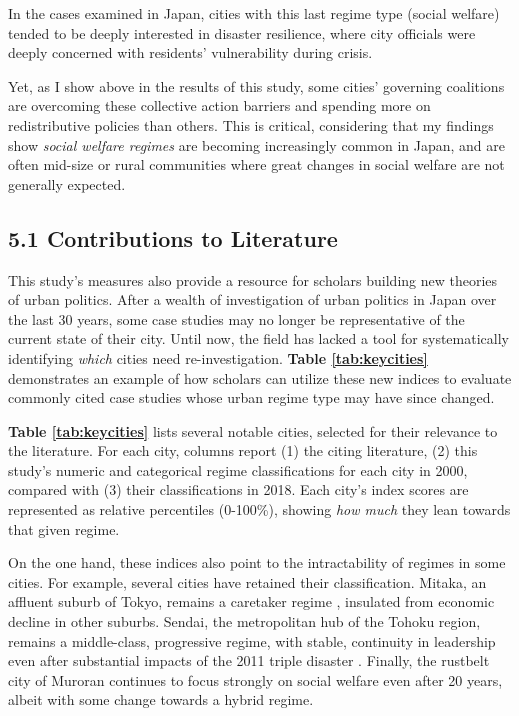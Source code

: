 \documentclass[preprint, 3p,
authoryear]{elsarticle} %
\begin{document}
In the cases examined in Japan, cities with this last regime type
(social welfare) tended to be deeply interested in disaster resilience,
where city officials were deeply concerned with residents' vulnerability
during crisis.

Yet, as I show above in the results of this study, some cities'
governing coalitions are overcoming these collective action barriers and
spending more on redistributive policies than others. This is critical,
considering that my findings show \emph{social welfare regimes} are
becoming increasingly common in Japan, and are often mid-size or rural
communities where great changes in social welfare are not generally
expected.

\hypertarget{contributions-to-literature}{%
\subsection{5.1 Contributions to
Literature}\label{contributions-to-literature}}

This study's measures also provide a resource for scholars building new
theories of urban politics. After a wealth of investigation of urban
politics in Japan over the last 30 years, some case studies may no
longer be representative of the current state of their city. Until now,
the field has lacked a tool for systematically identifying \emph{which}
cities need re-investigation. \textbf{Table \ref{tab:keycities}}
demonstrates an example of how scholars can utilize these new indices to
evaluate commonly cited case studies whose urban regime type may have
since changed.

\textbf{Table \ref{tab:keycities}} lists several notable cities,
selected for their relevance to the literature. For each city, columns
report (1) the citing literature, (2) this study's numeric and
categorical regime classifications for each city in 2000, compared with
(3) their classifications in 2018. Each city's index scores are
represented as relative percentiles (0-100\%), showing \emph{how much}
they lean towards that given regime.

On the one hand, these indices also point to the intractability of
regimes in some cities. For example, several cities have retained their
classification. Mitaka, an affluent suburb of Tokyo, remains a caretaker
regime
\citep{steiner_1957, fukuchi_and_yamaguchi_1997, ohashi_and_phelps_2021},
insulated from economic decline in other suburbs. Sendai, the
metropolitan hub of the Tohoku region, remains a middle-class,
progressive regime, with stable, continuity in leadership even after
substantial impacts of the 2011 triple disaster
\citep{morris_2012, tsuji_2017}. Finally, the rustbelt city of Muroran
\citep{edgington_2013} continues to focus strongly on social welfare
even after 20 years, albeit with some change towards a hybrid regime.
\end{document}
